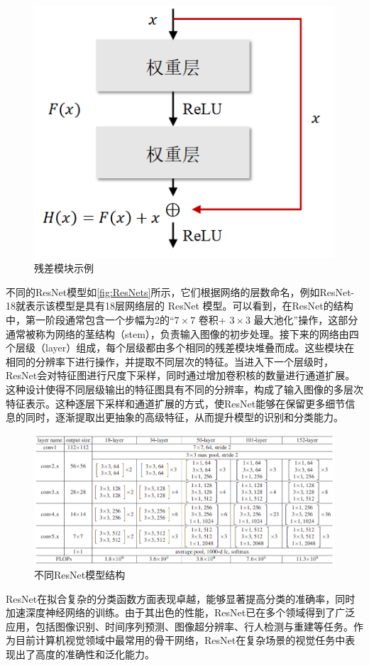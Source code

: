 \documentclass[lang=chs, degree=master, blindreview=false, adobe=false]{yanputhesis}
\begin{document}
\begin{figure}[htb]
	\centering
	\includegraphics[width=0.5\linewidth]{figs/残差模块.png}
	\caption{残差模块示例}
	\label{fig:Residual Block}
\end{figure}

不同的ResNet模型如\autoref{fig:ResNets}所示，它们根据网络的层数命名，例如ResNet-18就表示该模型是具有18层网络层的 ResNet 模型。可以看到，在ResNet的结构中，第一阶段通常包含一个步幅为2的“$7\times7$ 卷积+ $3\times3$ 最大池化”操作，这部分通常被称为网络的茎结构（stem），负责输入图像的初步处理。接下来的网络由四个层级（layer）组成，每个层级都由多个相同的残差模块堆叠而成。这些模块在相同的分辨率下进行操作，并提取不同层次的特征。当进入下一个层级时，ResNet会对特征图进行尺度下采样，同时通过增加卷积核的数量进行通道扩展。这种设计使得不同层级输出的特征图具有不同的分辨率，构成了输入图像的多层次特征表示。这种逐层下采样和通道扩展的方式，使ResNet能够在保留更多细节信息的同时，逐渐提取出更抽象的高级特征，从而提升模型的识别和分类能力。

\begin{figure}[htb]
	\centering
	\includegraphics[width=1\linewidth]{figs/不同ResNet模型结构.png}
	\caption{不同ResNet模型结构}
	\label{fig:ResNets}
\end{figure}

ResNet在拟合复杂的分类函数方面表现卓越，能够显著提高分类的准确率，同时加速深度神经网络的训练。由于其出色的性能，ResNet已在多个领域得到了广泛应用，包括图像识别、时间序列预测、图像超分辨率、行人检测与重建等任务。作为目前计算机视觉领域中最常用的骨干网络，ResNet在复杂场景的视觉任务中表现出了高度的准确性和泛化能力。
\end{document}
